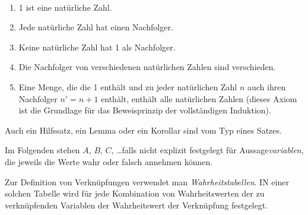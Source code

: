 \begin{example}~
\begin{enumerate}
\item 1 ist eine natürliche Zahl.
\item Jede natürliche Zahl hat einen Nachfolger.
\item Keine natürliche Zahl hat 1 als Nachfolger.
\item Die Nachfolger von verschiedenen natürlichen Zahlen sind verschieden.
\item Eine Menge, die die 1 enthält und zu jeder natürlichen Zahl $n$ auch ihren Nachfolger $n' = n + 1$ enthält, enthält alle natürlichen Zahlen (dieses Axiom ist die Grundlage für das Beweisprinzip der vollständigen Induktion).
\end{enumerate}
\end{example}

\begin{note}
Auch ein Hilfssatz, ein Lemma oder ein Korollar sind vom Typ eines Satzes.
\end{note}

Im Folgenden stehen $A$, $B$, $C$, \dots falls nicht explizit festgelegt für Aussage\emph{variablen}, die jeweils die Werte wahr oder falsch annehmen können.

Zur Definition von Verknüpfungen verwendet man \emph{Wahrheitstabellen}. IN einer solchen Tabelle wird für jede Kombination von Wahrheitswerten der zu verknüpfenden Variablen der Wahrheitswert der Verknüpfung festgelegt.

